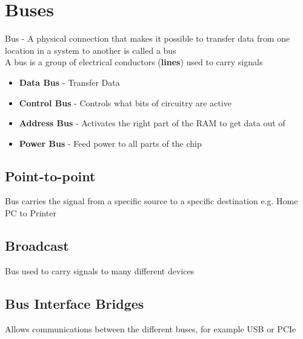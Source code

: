 \documentclass{article}[18pt]
\begin{document}
\section{Buses}

Bus - A physical connection that makes it possible to transfer data from one location in a system to another is called a bus\\
A bus is a group of electrical conductors (\textbf{lines}) used to carry signals
\begin{itemize}
\item \textbf{Data Bus} - Transfer Data
\item \textbf{Control Bus} - Controls what bits of circuitry are active
\item \textbf{Address Bus} - Activates the right part of the RAM to get data out of
\item \textbf{Power Bus} - Feed power to all parts of the chip
\end{itemize}
\subsection{Point-to-point}
Bus carries the signal from a specific source to a specific destination e.g. Home PC to Printer
\subsection{Broadcast}
Bus used to carry signals to many different devices
\subsection{Bus Interface Bridges}
Allows communications between the different buses, for example USB or PCIe
\end{document}
